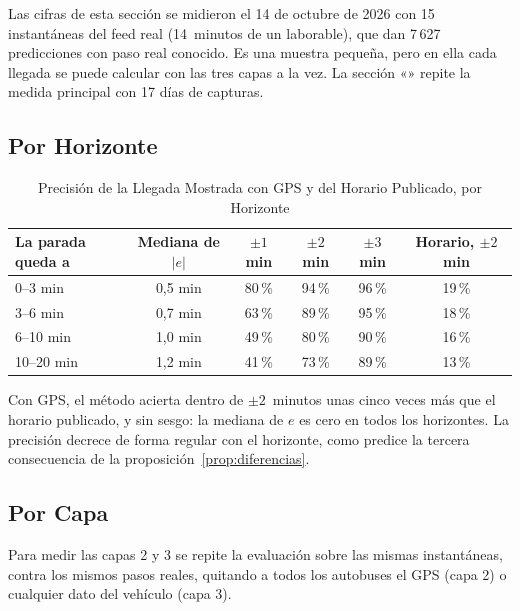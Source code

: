 Las cifras de esta sección se midieron el 14 de octubre de 2026 con 15 instantáneas del feed real (14~minutos de un
laborable), que dan 7\,627 predicciones con paso real conocido. Es una muestra pequeña, pero en ella cada llegada se
puede calcular con las tres capas a la vez. La sección «» repite la medida principal con 17
días de capturas.

\subsection{Por Horizonte}

\begin{table}[ht]
\centering
\caption{Precisión de la Llegada Mostrada con GPS y del Horario Publicado, por Horizonte}\label{tab:resultados}
\begin{tabular}{@{}lccccc@{}}
\toprule
La parada queda a & Mediana de $|e|$ & $\pm1$ min & $\pm2$ min & $\pm3$ min & Horario, $\pm2$ min\\
\midrule
0--3 min   & 0,5 min & 80\,\% & 94\,\% & 96\,\% & 19\,\%\\
3--6 min   & 0,7 min & 63\,\% & 89\,\% & 95\,\% & 18\,\%\\
6--10 min  & 1,0 min & 49\,\% & 80\,\% & 90\,\% & 16\,\%\\
10--20 min & 1,2 min & 41\,\% & 73\,\% & 89\,\% & 13\,\%\\
\bottomrule
\end{tabular}
\end{table}

Con GPS, el método acierta dentro de $\pm2$~minutos unas cinco veces más que el horario publicado, y sin sesgo: la
mediana de $e$ es cero en todos los horizontes. La precisión decrece de forma regular con el horizonte, como predice la
tercera consecuencia de la proposición~\ref{prop:diferencias}.

\subsection{Por Capa}

Para medir las capas 2 y 3 se repite la evaluación sobre las mismas instantáneas, contra los mismos pasos reales,
quitando a todos los autobuses el GPS (capa 2) o cualquier dato del vehículo (capa 3).

